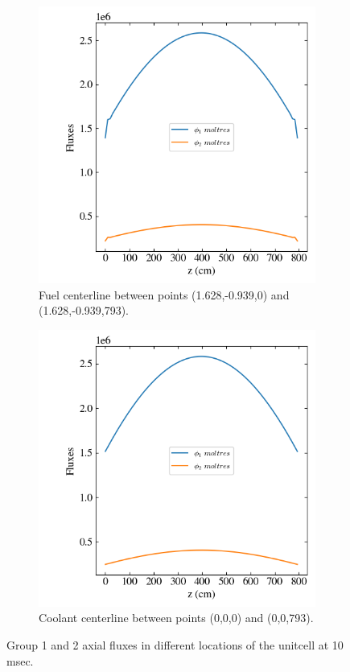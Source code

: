 \documentclass[11pt,letterpaper]{article}
\begin{document}
	\begin{figure}[htbp!]
		\centering
		\begin{subfigure}[t]{0.4\textwidth}
			\centering
			\includegraphics[width=\linewidth]{3D-unitcell1}
			\caption{Fuel centerline between points (1.628,-0.939,0) and (1.628,-0.939,793).}
		\end{subfigure}
		\begin{subfigure}[t]{0.4\textwidth}
			\centering
			\includegraphics[width=\linewidth]{3D-unitcell2}
			\caption{Coolant centerline between points (0,0,0) and (0,0,793).}
		\end{subfigure}
		\hfill
		\caption{Group 1 and 2 axial fluxes in different locations of the unitcell at 10 msec.}
		\label{fig:3D-unitcell1}
	\end{figure}
\end{document}
